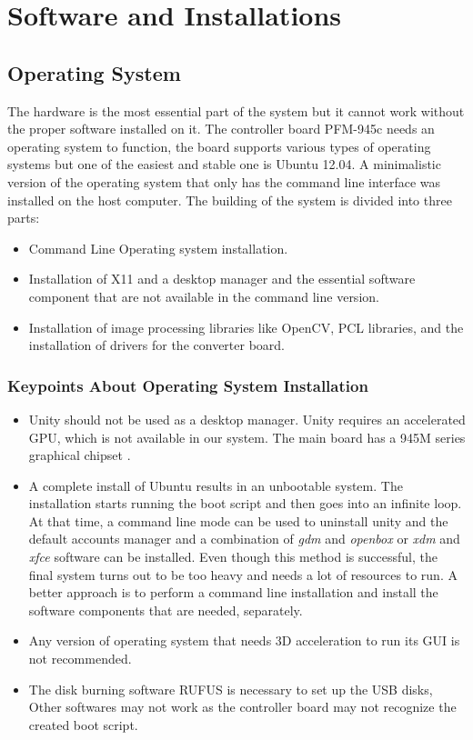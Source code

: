 
\chapter{Software and Installations}
\label{chap:Software}
\section{Operating System}
\label{sec:OS}
The hardware is the most essential part of the system but it cannot work without the proper software installed on it.  The controller board PFM-945c needs an operating system to function, the board supports various types of operating systems but one of the easiest and  stable one is Ubuntu 12.04. A minimalistic version of the operating system that only has the command line interface was installed on the host computer.
The building of the system is divided into three parts:
\begin{itemize}
\item Command Line Operating system installation.
\item Installation of X11 and a desktop manager and the essential software component that are not available in the command line version.
\item Installation of image processing libraries like OpenCV, PCL libraries, and the installation of drivers for the converter board.
\end{itemize}

\subsection{Keypoints About Operating System Installation}
\begin{itemize}

\item Unity should not be used as a desktop manager. Unity requires an accelerated GPU, which is not available in our system. The main board has a 945M series graphical chipset \cite{Aaeon}.

 \item A complete install of Ubuntu results in an unbootable system. The installation starts running the boot script and then goes into an infinite loop. At that time, a command line mode can be used to uninstall unity and the default accounts manager and a combination of \textit{gdm} and \textit{openbox} or  \textit{xdm} and \textit{xfce} software can be installed. Even though this method is successful, the final system turns out to be too heavy and needs a lot of resources to run. A better approach is to perform a command line installation and install the software components that are needed, separately.
 
\item Any version of operating system that needs 3D acceleration to run its GUI is not recommended.

\item The disk burning software RUFUS is necessary to set up the USB disks, Other softwares may not work as the controller board may not recognize the created boot script.

\end{itemize}
